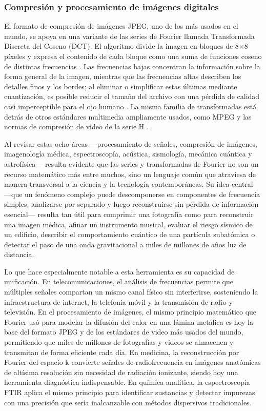 \subsubsection{Compresión y procesamiento de imágenes digitales}

El formato de compresión de imágenes JPEG, uno de los más usados en el mundo, se apoya en una variante de las series de Fourier llamada Transformada Discreta del Coseno (DCT). El algoritmo divide la imagen en bloques de 8$\times$8 píxeles y expresa el contenido de cada bloque como una suma de funciones coseno de distintas frecuencias \cite{bryan:jpeg-matematicas,arxiv:dct-jpeg}. Las frecuencias bajas concentran la información sobre la forma general de la imagen, mientras que las frecuencias altas describen los detalles finos y los bordes; al eliminar o simplificar estas últimas mediante cuantización, es posible reducir el tamaño del archivo con una pérdida de calidad casi imperceptible para el ojo humano \cite{arxiv:dct-jpeg}. La misma familia de transformadas está detrás de otros estándares multimedia ampliamente usados, como MPEG y las normas de compresión de video de la serie H \cite{sciencedirect:dct-overview}.

Al revisar estas ocho áreas —procesamiento de señales, compresión de imágenes, imagenología médica, espectroscopía, acústica, sismología, mecánica cuántica y astrofísica— resulta evidente que las series y transformadas de Fourier no son un recurso matemático más entre muchos, sino un lenguaje común que atraviesa de manera transversal a la ciencia y la tecnología contemporáneas. Su idea central —que un fenómeno complejo puede descomponerse en componentes de frecuencia simples, analizarse por separado y luego reconstruirse sin pérdida de información esencial— resulta tan útil para comprimir una fotografía como para reconstruir una imagen médica, afinar un instrumento musical, evaluar el riesgo sísmico de un edificio, describir el comportamiento cuántico de una partícula subatómica o detectar el paso de una onda gravitacional a miles de millones de años luz de distancia.

Lo que hace especialmente notable a esta herramienta es su capacidad de unificación. En telecomunicaciones, el análisis de frecuencias permite que múltiples señales compartan un mismo canal físico sin interferirse, sosteniendo la infraestructura de internet, la telefonía móvil y la transmisión de radio y televisión. En el procesamiento de imágenes, el mismo principio matemático que Fourier usó para modelar la difusión del calor en una lámina metálica es hoy la base del formato JPEG y de los estándares de video más usados del mundo, permitiendo que miles de millones de fotografías y videos se almacenen y transmitan de forma eficiente cada día. En medicina, la reconstrucción por Fourier del espacio-k convierte señales de radiofrecuencia en imágenes anatómicas de altísima resolución sin necesidad de radiación ionizante, siendo hoy una herramienta diagnóstica indispensable. En química analítica, la espectroscopía FTIR aplica el mismo principio para identificar sustancias y detectar impurezas con una precisión que sería inalcanzable con métodos dispersivos tradicionales.

